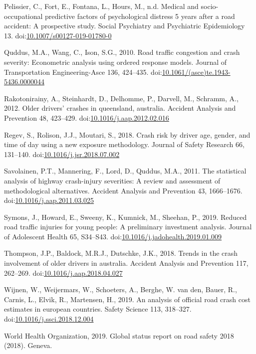\documentclass[]{elsarticle} %
\begin{document}
\leavevmode\hypertarget{ref-Pelissier2019medical}{}%
Pelissier, C., Fort, E., Fontana, L., Hours, M., n.d. Medical and
socio-occupational predictive factors of psychological distress 5 years
after a road accident: A prospective study. Social Psychiatry and
Psychiatric Epidemiology 13.
doi:\href{https://doi.org/10.1007/s00127-019-01780-0}{10.1007/s00127-019-01780-0}

\leavevmode\hypertarget{ref-Quddus2010road}{}%
Quddus, M.A., Wang, C., Ison, S.G., 2010. Road traffic congestion and
crash severity: Econometric analysis using ordered response models.
Journal of Transportation Engineering-Asce 136, 424--435.
doi:\href{https://doi.org/10.1061/(asce)te.1943-5436.0000044}{10.1061/(asce)te.1943-5436.0000044}

\leavevmode\hypertarget{ref-Rakotonirainy2012older}{}%
Rakotonirainy, A., Steinhardt, D., Delhomme, P., Darvell, M., Schramm,
A., 2012. Older drivers' crashes in queensland, australia. Accident
Analysis and Prevention 48, 423--429.
doi:\href{https://doi.org/10.1016/j.aap.2012.02.016}{10.1016/j.aap.2012.02.016}

\leavevmode\hypertarget{ref-Regev2018crash}{}%
Regev, S., Rolison, J.J., Moutari, S., 2018. Crash risk by driver age,
gender, and time of day using a new exposure methodology. Journal of
Safety Research 66, 131--140.
doi:\href{https://doi.org/10.1016/j.jsr.2018.07.002}{10.1016/j.jsr.2018.07.002}

\leavevmode\hypertarget{ref-Savolainen2011statistical}{}%
Savolainen, P.T., Mannering, F., Lord, D., Quddus, M.A., 2011. The
statistical analysis of highway crash-injury severities: A review and
assessment of methodological alternatives. Accident Analysis and
Prevention 43, 1666--1676.
doi:\href{https://doi.org/10.1016/j.aap.2011.03.025}{10.1016/j.aap.2011.03.025}

\leavevmode\hypertarget{ref-Symons2019reduced}{}%
Symons, J., Howard, E., Sweeny, K., Kumnick, M., Sheehan, P., 2019.
Reduced road traffic injuries for young people: A preliminary investment
analysis. Journal of Adolescent Health 65, S34--S43.
doi:\href{https://doi.org/10.1016/j.jadohealth.2019.01.009}{10.1016/j.jadohealth.2019.01.009}

\leavevmode\hypertarget{ref-Thompson2018trends}{}%
Thompson, J.P., Baldock, M.R.J., Dutschke, J.K., 2018. Trends in the
crash involvement of older drivers in australia. Accident Analysis and
Prevention 117, 262--269.
doi:\href{https://doi.org/10.1016/j.aap.2018.04.027}{10.1016/j.aap.2018.04.027}

\leavevmode\hypertarget{ref-Wijnen2019analysis}{}%
Wijnen, W., Weijermars, W., Schoeters, A., Berghe, W. van den, Bauer,
R., Carnis, L., Elvik, R., Martensen, H., 2019. An analysis of official
road crash cost estimates in european countries. Safety Science 113,
318--327.
doi:\href{https://doi.org/10.1016/j.ssci.2018.12.004}{10.1016/j.ssci.2018.12.004}

\leavevmode\hypertarget{ref-WHO2019global}{}%
World Health Organization, 2019. Global status report on road safety
2018 (2018). Geneva.
\end{document}

